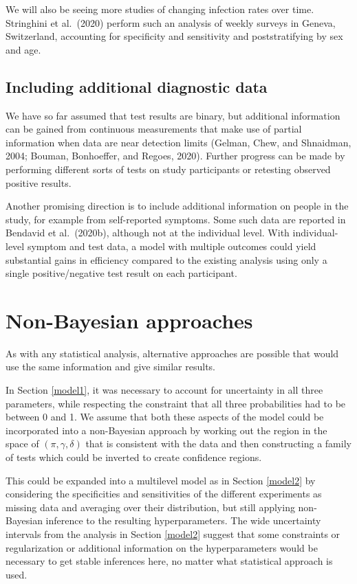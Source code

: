 \documentclass[11pt]{article}
\begin{document}
We will also be seeing more studies of changing infection rates over
time.  Stringhini et al.\ (2020) perform such an analysis of weekly
surveys in Geneva, Switzerland, accounting for specificity and
sensitivity and poststratifying by sex and age.

\subsection{Including additional diagnostic data}

We have so far assumed that test results are binary, but additional
information can be gained from continuous measurements that make use
of partial information when data are near detection limits (Gelman,
Chew, and Shnaidman, 2004; Bouman, Bonhoeffer, and Regoes, 2020).
Further progress can be made by performing different sorts of tests on
study participants or retesting observed positive results.

Another promising direction is to include additional information on
people in the study, for example from self-reported symptoms.  Some
such data are reported in Bendavid et al.\ (2020b), although not at
the individual level. With individual-level symptom and test data, a
model with multiple outcomes could yield substantial gains in
efficiency compared to the existing analysis using only a single
positive/negative test result on each participant.

\section{Non-Bayesian approaches}\label{nonbayes}

As with any statistical analysis, alternative approaches are possible
that would use the same information and give similar results.

In Section \ref{model1}, it was necessary to account for uncertainty
in all three parameters, while respecting the constraint that all
three probabilities had to be between 0 and 1.  We assume that both
these aspects of the model could be incorporated into a non-Bayesian
approach by working out the region in the space of
$(\pi,\gamma,\delta)$ that is consistent with the data and then
constructing a family of tests which could be inverted to create
confidence regions.

This could be expanded into a multilevel model as in Section \ref{model2} by considering the specificities and sensitivities of the different experiments as missing data and averaging over their distribution, but still applying non-Bayesian inference to the resulting hyperparameters.  The wide uncertainty intervals from the analysis in Section \ref{model2} suggest that some constraints or regularization or additional information on the hyperparameters would be necessary to get stable inferences here, no matter what statistical approach is used.
\end{document}
